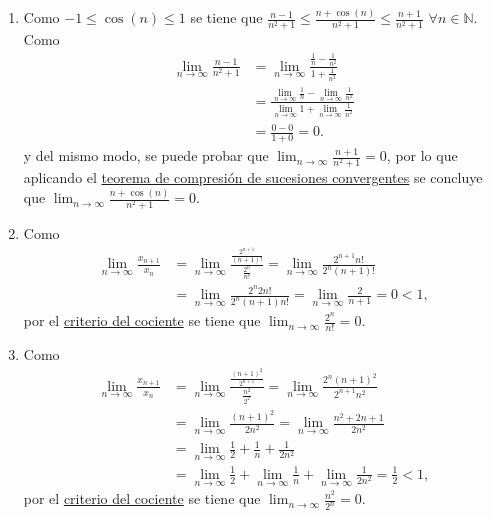 \documentclass[
  spanish,
  a4paper,
]{scrreport}
\theoremstyle{definition}
\theoremstyle{remark}
\begin{document}
\begin{tcolorbox}[enhanced jigsaw, arc=.35mm, bottomrule=.15mm, bottomtitle=1mm, breakable, colback=white, colbacktitle=quarto-callout-tip-color!10!white, colframe=quarto-callout-tip-color-frame, coltitle=black, left=2mm, leftrule=.75mm, opacityback=0, opacitybacktitle=0.6, rightrule=.15mm, title=\textcolor{quarto-callout-tip-color}{\faLightbulb}\hspace{0.5em}{Solución}, titlerule=0mm, toprule=.15mm, toptitle=1mm]

\begin{enumerate}
\def\labelenumi{\alph{enumi}.}
\item
  Como \(-1\leq \cos(n)\leq 1\) se tiene que
  \(\frac{n-1}{n^2+1}\leq \frac{n+\cos(n)}{n^2+1}\leq \frac{n+1}{n^2+1}\)
  \(\forall n\in\mathbb{N}\). Como \begin{align*}
  \lim_{n\to\infty}\frac{n-1}{n^2+1} &= \lim_{n\to\infty}\frac{\frac{1}{n}-\frac{1}{n^2}}{1+\frac{1}{n^2}}\\  
  &= \frac{\lim_{n\to\infty}\frac{1}{n}-\lim_{n\to\infty}\frac{1}{n^2}}{\lim_{n\to\infty}1 + \lim_{n\to\infty}\frac{1}{n^2}}\\ 
  &= \frac{0-0}{1+0} = 0.
  \end{align*} y del mismo modo, se puede probar que
  \(\lim_{n\to\infty}\frac{n+1}{n^2+1}=0\), por lo que aplicando el
  \href{https://aprendeconalf.es/analisis-manual/sucesiones.html\#thm-compresion-sucesiones-convergentes}{teorema
  de compresión de sucesiones convergentes} se concluye que
  \(\lim_{n\to\infty}\frac{n+\cos(n)}{n^2+1}=0\).
\item
  Como \begin{align*}
  \lim_{n\to\infty}\frac{x_{n+1}}{x_n} &= \lim_{n\to\infty}\frac{\frac{2^{n+1}}{(n+1)!}}{\frac{2^n}{n!}} = \lim_{n\to\infty}\frac{2^{n+1}n!}{2^n(n+1)!}\\ 
  &= \lim_{n\to\infty}\frac{2^n2n!}{2^n(n+1)n!} = \lim_{n\to\infty}\frac{2}{n+1} = 0 <1,
  \end{align*} por el
  \href{https://aprendeconalf.es/analisis-manual/sucesiones.html\#prp-criterio-cociente-sucesiones}{criterio
  del cociente} se tiene que \(\lim_{n\to\infty}\frac{2^n}{n!}=0\).
\item
  Como \begin{align*}
  \lim_{n\to\infty}\frac{x_{n+1}}{x_n} &= \lim_{n\to\infty}\frac{\frac{(n+1)^2}{2^{n+1}}}{\frac{n^2}{2^2}} = \lim_{n\to\infty}\frac{2^n(n+1)^2}{2^{n+1}n^2}\\ 
  &= \lim_{n\to\infty}\frac{(n+1)^2}{2n^2} = \lim_{n\to\infty}\frac{n^2+2n+1}{2n^2} \\ 
  &= \lim_{n\to\infty}\frac{1}{2}+\frac{1}{n}+\frac{1}{2n^2}\\  
  & = \lim_{n\to\infty}\frac{1}{2}+\lim_{n\to\infty}\frac{1}{n}+\lim_{n\to\infty}\frac{1}{2n^2} = \frac{1}{2}<1,
  \end{align*} por el
  \href{https://aprendeconalf.es/analisis-manual/sucesiones.html\#prp-criterio-cociente-sucesiones}{criterio
  del cociente} se tiene que \(\lim_{n\to\infty}\frac{n^2}{2^n}=0\).
\end{enumerate}

\end{tcolorbox}
\end{document}
